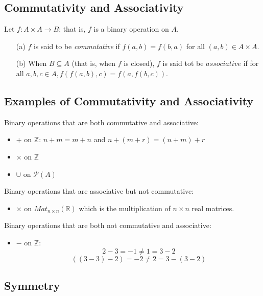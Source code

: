 \documentclass[11pt]{article}
\begin{document}
    \subsection{Commutativity and Associativity}
    Let \(f: A \times A \rightarrow B\); that is, $f$ is a binary operation on $A$.
    \begin{enumerate}
        \item[(a)] $f$ is said to be \emph{commutative} if \(f(a,b) = f(b,a)\) for all \((a,b) \in A \times A.\)
        \item[(b)] When \(B \subseteq A\) (that is, when $f$ is closed), $f$ is said tot be $associative$ if for all \(a,b,c \in A, f(f(a,b),c) = f(a,f(b,c)).\)  
    \end{enumerate}

    \subsection{Examples of Commutativity and Associativity}
    
    Binary operations that are both commutative and associative:
    \begin{itemize}
        \item + on \(\mathbb{Z}\): \(n + m = m + n\) and \(n + (m + r) = (n + m) + r\)
        \item \(\times\) on \(\mathbb{Z}\)
        \item \(\cup\) on \(\mathcal{P}(A)\)
    \end{itemize}

    Binary operations that are associative but not commutative:
    \begin{itemize}
        \item \(\times\) on \(Mat_{n \times n}(\mathbb{R})\) which is the multiplication of $n \times n$ real matrices.
    \end{itemize}


    Binary operations that are both not commutative and associative:
    \begin{itemize}
        \item \(-\) on \(\mathbb{Z}\): \[2 - 3 = -1 \neq 1 = 3 - 2\] \[((3-3) - 2) = -2 \neq 2 = 3 - (3 - 2) \]
    \end{itemize}

    \subsection{Symmetry}
\end{document}
